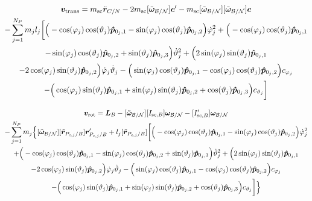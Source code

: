 \documentclass[]{BasiliskReportMemo}
\begin{document}
	\begin{multline}
	\bm v_{\text{trans}} = m_{\text{sc}}\ddot{\bm r}_{C/N} - 2m_{\text{sc}}[\tilde{\bm\omega}_{\cal B/N}] \bm c'
	-m_{\text{sc}}[\tilde{\bm\omega}_{\cal B/N}][\tilde{\bm\omega}_{\cal B/N}]\bm{c}
	\\-\sum_{j=1}^{N_{P}}m_j l_j \bigg[ 
	\Big(-\cos(\varphi_j)\cos(\vartheta_j)\bm{\hat{p}}_{0_j,1}-\sin(\varphi_j)\cos(\vartheta_j)\bm{\hat{p}}_{0_j,2}\Big)\dot{\varphi}_j^2
	+\Big(-\cos(\varphi_j)\cos(\vartheta_j)\bm{\hat{p}}_{0_j,1}\\-\sin(\varphi_j)\cos(\vartheta_j)\bm{\hat{p}}_{0_j,2}+\sin(\vartheta_j)\bm{\hat{p}}_{0_j,3} \Big)\dot{\vartheta}_j^2 +
	\Big(2\sin(\varphi_j)\sin(\vartheta_j)\bm{\hat{p}}_{0_j,1}\\ -2\cos(\varphi_j)\sin(\vartheta_j)\bm{\hat{p}}_{0_j,2}\Big)\dot{\varphi}_j\dot{\vartheta}_j
	-\Big(\sin(\varphi_j)\cos(\vartheta_j)\bm{\hat{p}}_{0_j,1}-\cos(\varphi_j)\cos(\vartheta_j)\bm{\hat{p}}_{0_j,2}\Big)c_{\varphi_j}\\ - \Big(\cos(\varphi_j)\sin(\vartheta_j)\bm{\hat{p}}_{0_j,1}+\sin(\varphi_j)\sin(\vartheta_j)\bm{\hat{p}}_{0_j,2}+\cos(\vartheta_j)\bm{\hat{p}}_{0_j,3}\Big) c_{\vartheta_j} 
	\bigg]
	\end{multline}
	
	\begin{multline}
	\bm v_{\text{rot}} = 	\bm{L}_B-[\bm{\tilde{\omega}}_{\cal B/N}] [I_{\text{sc},B}] \bm\omega_{\cal B/N}
	- [I'_{\text{sc},B}] \bm\omega_{\cal B/N}\\- \sum\limits_{j=1}^{N_P} m_j \Big\{[\tilde{\bm\omega}_{\cal B/N}] [\tilde{\bm{r}}_{P_{c,j}/B}] \bm{r}'_{P_{c,j}/B}
	+l_j[\tilde{\bm{r}}_{P_{c,j}/B}]\bigg[
	\Big(-\cos(\varphi_j)\cos(\vartheta_j)\bm{\hat{p}}_{0_j,1} -\sin(\varphi_j)\cos(\vartheta_j)\bm{\hat{p}}_{0_j,2}\Big)\dot{\varphi}_j^2
	\\+\Big(-\cos(\varphi_j)\cos(\vartheta_j)\bm{\hat{p}}_{0_j,1}-\sin(\varphi_j)\cos(\vartheta_j)\bm{\hat{p}}_{0_j,2}+\sin(\vartheta_j)\bm{\hat{p}}_{0_j,3} \Big)\dot{\vartheta}_j^2 +
	\Big(2\sin(\varphi_j)\sin(\vartheta_j)\bm{\hat{p}}_{0_j,1}\\ -2\cos(\varphi_j)\sin(\vartheta_j)\bm{\hat{p}}_{0_j,2}\Big)\dot{\varphi}_j\dot{\vartheta}_j
	-\Big(\sin(\varphi_j)\cos(\vartheta_j)\bm{\hat{p}}_{0_j,1} -\cos(\varphi_j)\cos(\vartheta_j)\bm{\hat{p}}_{0_j,2}\Big)c_{\varphi_j} \\-   \Big(\cos(\varphi_j)\sin(\vartheta_j)\bm{\hat{p}}_{0_j,1}+\sin(\varphi_j)\sin(\vartheta_j)\bm{\hat{p}}_{0_j,2}+\cos(\vartheta_j)\bm{\hat{p}}_{0_j,3}\Big) c_{\vartheta_j}
	\bigg]\Big\}
	\end{multline}
	
\end{document}
